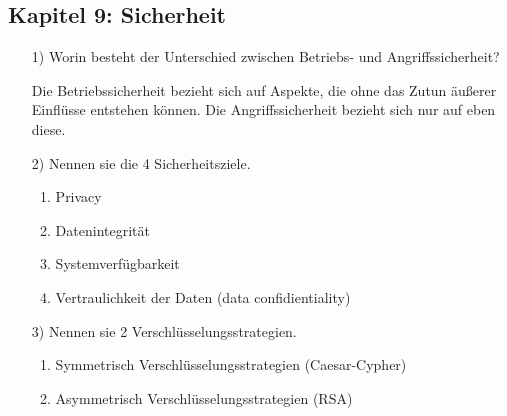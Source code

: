 \documentclass[11pt,a4paper]{article}
\begin{document}
\pagebreak


\subsection*{Kapitel 9: Sicherheit}
\begin{itemize}
\item[1)] Worin besteht der Unterschied zwischen Betriebs- und Angriffssicherheit?

Die Betriebssicherheit bezieht sich auf Aspekte, die ohne das Zutun äußerer Einflüsse entstehen können.
Die Angriffssicherheit bezieht sich nur auf eben diese.

\item[2)] Nennen sie die 4 Sicherheitsziele.

\begin{enumerate}
\item Privacy
\item Datenintegrität
\item Systemverfügbarkeit
\item Vertraulichkeit der Daten (data confidientiality)
\end{enumerate}

\item[3)] Nennen sie 2 Verschlüsselungsstrategien.

\begin{enumerate}
\item Symmetrisch Verschlüsselungsstrategien (Caesar-Cypher)
\item Asymmetrisch Verschlüsselungsstrategien (RSA)
\end{enumerate}

\end{itemize}
\end{document}
